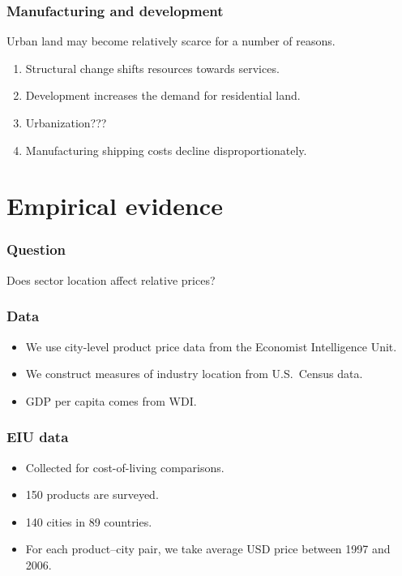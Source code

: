 \documentclass[compress,mathserif]{beamer}
\newcounter{perc}
\newcounter{percek}
\renewcommand{\time}[1]{\addtocounter{percek}{#1}}
\begin{document}
\begin{frame}\frametitle{Manufacturing and development}
Urban land may become relatively scarce for a number of reasons.
\begin{enumerate}
\item Structural change shifts resources towards services.
\item Development increases the demand for residential land.
\item Urbanization???
\item Manufacturing shipping costs decline disproportionately.
\end{enumerate}
\end{frame}
\time 1


\section{Empirical evidence}

\begin{frame}\frametitle{Question}
Does sector location affect relative prices?
\end{frame}

\begin{frame}\frametitle{Data}
\begin{itemize}
\item We use city-level product price data from the Economist Intelligence Unit.
\item We construct measures of industry location from U.S.~Census data.
\item GDP per capita comes from WDI.
\end{itemize}
\end{frame}

\begin{frame}\frametitle{EIU data}
\begin{itemize}
\item Collected for cost-of-living comparisons.
\item 150 products are surveyed.
\item 140 cities in 89 countries.
\item For each product--city pair, we take average USD price between 1997 and 2006.
\end{itemize}
\end{frame}
\time 4
\end{document}
